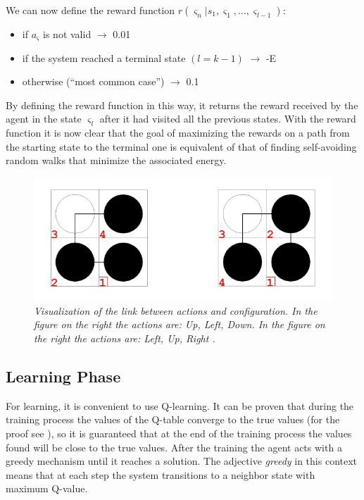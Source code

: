 We can now define the reward function $r(\varsigma_{n}|s_{1}, \varsigma_{1}, \ldots, \varsigma_{l-1})$:
\begin{itemize}
    \item if $a_{\varsigma}$ is not valid $\rightarrow$ 0.01
    \item if the system reached a terminal state $(l = k-1)$ $\rightarrow$ -E
    \item otherwise (``most common case'') $\rightarrow$ 0.1
\end{itemize}
By defining the reward function in this way, it returns the reward received by the agent in the state $\varsigma_{l}$ after it had visited all the previous states.
With the reward function it is now clear that the goal of maximizing the rewards on a path from the starting state to the terminal one is equivalent of that of finding self-avoiding random walks that minimize the associated energy.

\begin{figure}[H]
    \centering
    \includegraphics[width=.75\textwidth]{img/rl1.png}
    \caption{\emph{Visualization of the link between actions and configuration. In the figure on the right the actions are: Up, Left, Down. In the figure on the right the actions are: Left, Up, Right \cite{czibula2011reinforcement}.}}
    \label{fig:rl1}
\end{figure}
\subsection{Learning Phase}

For learning, it is convenient to use Q-learning.
It can be proven that during the training process the values of the Q-table converge to the true values (for the proof see \cite{czibula2011reinforcement}), so it is guaranteed that at the end of the training process the values found will be close to the true values.
After the training the agent acts with a greedy mechanism until it reaches a solution.
The adjective \emph{greedy} in this context means that at each step the system transitions to a neighbor state with maximum Q-value.

